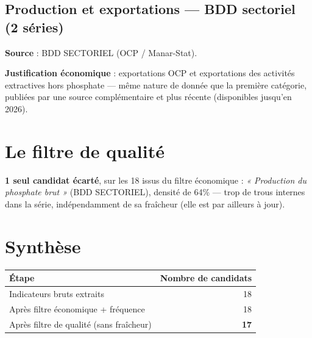 \documentclass[11pt,a4paper]{article}
\begin{document}
\subsection{Production et exportations --- BDD sectoriel (2 séries)}

\textbf{Source} : BDD SECTORIEL (OCP / Manar-Stat).

\textbf{Justification économique} : exportations OCP et exportations des activités extractives hors phosphate --- même nature de donnée que la première catégorie, publiées par une source complémentaire et plus récente (disponibles jusqu'en 2026).

\section{Le filtre de qualité}

\begin{fichebox}
\textbf{1 seul candidat écarté}, sur les 18 issus du filtre économique : \textit{« Production du phosphate brut »} (BDD SECTORIEL), densité de 64\% --- trop de trous internes dans la série, indépendamment de sa fraîcheur (elle est par ailleurs à jour).
\end{fichebox}

\section{Synthèse}

\begin{fichebox}
\begin{center}
\begin{tabular}{lr}
\toprule
\textbf{Étape} & \textbf{Nombre de candidats} \\
\midrule
Indicateurs bruts extraits & 18 \\
Après filtre économique + fréquence & 18 \\
Après filtre de qualité (sans fraîcheur) & \textbf{17} \\
\bottomrule
\end{tabular}
\end{center}
\end{fichebox}
\end{document}
